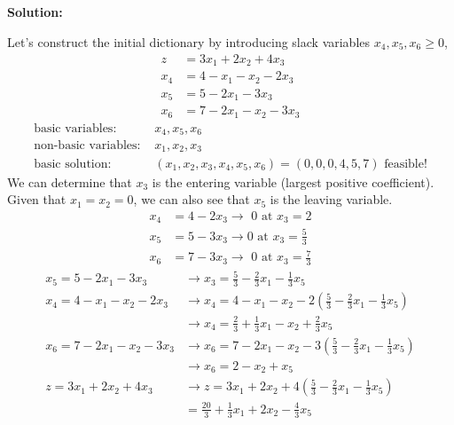 \documentclass[11pt]{article}
\newenvironment{solution}
  {\par\noindent\textbf{Solution:}\par}
  {\par}
\begin{document}
\subsection{}
\begin{solution}
  Let's construct the initial dictionary by introducing slack variables $x_4,x_5,x_6 \ge 0$,
  \[
  \begin{aligned}
    z &= 3x_1+2x_2+4x_3 \\ 
    x_4 &= 4-x_1-x_2-2x_3 \\ 
    x_5 &= 5-2x_1-3x_3 \\ 
    x_6 &= 7 - 2x_1 - x_2 -3x_3
  \end{aligned}
  \]
\[
  \begin{aligned}
    \text{basic variables: } &x_4,x_5,x_6 \\ 
    \text{non-basic variables: } &x_1,x_2,x_3 \\ 
    \text{basic solution: } &(x_1,x_2,x_3,x_4,x_5,x_6) = (0,0,0,4,5,7) \text{ feasible!}
  \end{aligned}
\]
We can determine that $x_3$ is the entering variable (largest positive coefficient). Given that $x_1=x_2=0$, we can also see that $x_5$ is the leaving variable.
\[
\begin{aligned}
  x_4 &= 4-2x_3 \to \text{ 0 at }x_3=2 \\ 
  x_5 &= 5 -3x_3 \to \text{0 at }x_3 = \frac{5}{3}\\ 
  x_6 &= 7-3x_3 \to \text{ 0 at }x_3 = \frac{7}{3}
\end{aligned}
\]
\[
  \begin{aligned}
    x_5 = 5-2x_1-3x_3 &\to x_3 = \frac{5}{3} -\frac{2}{3}x_1 - \frac{1}{3}x_5 \\ 
    x_4 = 4-x_1 -x_2 -2x_3 &\to x_4 = 4-x_1-x_2 -2(\frac{5}{3} -\frac{2}{3}x_1 - \frac{1}{3}x_5) \\ 
                           &\to x_4 = \frac{2}{3} +\frac{1}{3} x_1 -x_2 + \frac{2}{3}x_5 \\ 
    x_6 = 7-2x_1-x_2-3x_3 &\to x_6 = 7 - 2x_1 -x_2 -3(\frac{5}{3} -\frac{2}{3}x_1 - \frac{1}{3}x_5) \\ 
                          &\to x_6 = 2-x_2+x_5 \\ 
    z=3x_1+2x_2+4x_3 &\to z=3x_1+2x_2+4(\frac{5}{3} -\frac{2}{3}x_1 - \frac{1}{3}x_5) \\ 
                     &= \frac{20}{3} + \frac{1}{3}x_1  +2x_2 -\frac{4}{3}x_5
  \end{aligned}
\]


\end{solution}
\end{document}

